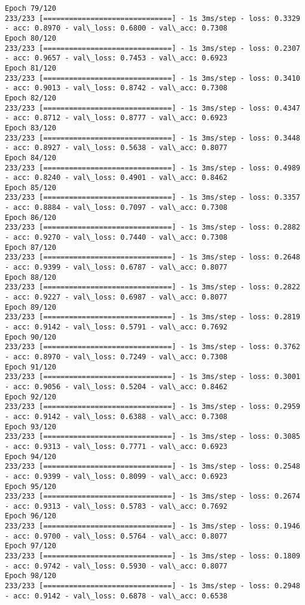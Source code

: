 \documentclass[11pt]{article}
\begin{document}
\begin{Verbatim}[commandchars=\\\{\}]
Epoch 79/120
233/233 [==============================] - 1s 3ms/step - loss: 0.3329 - acc: 0.8970 - val\_loss: 0.6800 - val\_acc: 0.7308
Epoch 80/120
233/233 [==============================] - 1s 3ms/step - loss: 0.2307 - acc: 0.9657 - val\_loss: 0.7453 - val\_acc: 0.6923
Epoch 81/120
233/233 [==============================] - 1s 3ms/step - loss: 0.3410 - acc: 0.9013 - val\_loss: 0.8742 - val\_acc: 0.7308
Epoch 82/120
233/233 [==============================] - 1s 3ms/step - loss: 0.4347 - acc: 0.8712 - val\_loss: 0.8777 - val\_acc: 0.6923
Epoch 83/120
233/233 [==============================] - 1s 3ms/step - loss: 0.3448 - acc: 0.8927 - val\_loss: 0.5638 - val\_acc: 0.8077
Epoch 84/120
233/233 [==============================] - 1s 3ms/step - loss: 0.4989 - acc: 0.8240 - val\_loss: 0.4901 - val\_acc: 0.8462
Epoch 85/120
233/233 [==============================] - 1s 3ms/step - loss: 0.3357 - acc: 0.8884 - val\_loss: 0.7097 - val\_acc: 0.7308
Epoch 86/120
233/233 [==============================] - 1s 3ms/step - loss: 0.2882 - acc: 0.9270 - val\_loss: 0.7440 - val\_acc: 0.7308
Epoch 87/120
233/233 [==============================] - 1s 3ms/step - loss: 0.2648 - acc: 0.9399 - val\_loss: 0.6787 - val\_acc: 0.8077
Epoch 88/120
233/233 [==============================] - 1s 3ms/step - loss: 0.2822 - acc: 0.9227 - val\_loss: 0.6987 - val\_acc: 0.8077
Epoch 89/120
233/233 [==============================] - 1s 3ms/step - loss: 0.2819 - acc: 0.9142 - val\_loss: 0.5791 - val\_acc: 0.7692
Epoch 90/120
233/233 [==============================] - 1s 3ms/step - loss: 0.3762 - acc: 0.8970 - val\_loss: 0.7249 - val\_acc: 0.7308
Epoch 91/120
233/233 [==============================] - 1s 3ms/step - loss: 0.3001 - acc: 0.9056 - val\_loss: 0.5204 - val\_acc: 0.8462
Epoch 92/120
233/233 [==============================] - 1s 3ms/step - loss: 0.2959 - acc: 0.9142 - val\_loss: 0.6388 - val\_acc: 0.7308
Epoch 93/120
233/233 [==============================] - 1s 3ms/step - loss: 0.3085 - acc: 0.9313 - val\_loss: 0.7771 - val\_acc: 0.6923
Epoch 94/120
233/233 [==============================] - 1s 3ms/step - loss: 0.2548 - acc: 0.9399 - val\_loss: 0.8099 - val\_acc: 0.6923
Epoch 95/120
233/233 [==============================] - 1s 3ms/step - loss: 0.2674 - acc: 0.9313 - val\_loss: 0.5783 - val\_acc: 0.7692
Epoch 96/120
233/233 [==============================] - 1s 3ms/step - loss: 0.1946 - acc: 0.9700 - val\_loss: 0.5764 - val\_acc: 0.8077
Epoch 97/120
233/233 [==============================] - 1s 3ms/step - loss: 0.1809 - acc: 0.9742 - val\_loss: 0.5930 - val\_acc: 0.8077
Epoch 98/120
233/233 [==============================] - 1s 3ms/step - loss: 0.2948 - acc: 0.9142 - val\_loss: 0.6878 - val\_acc: 0.6538

\end{Verbatim}
\end{document}
